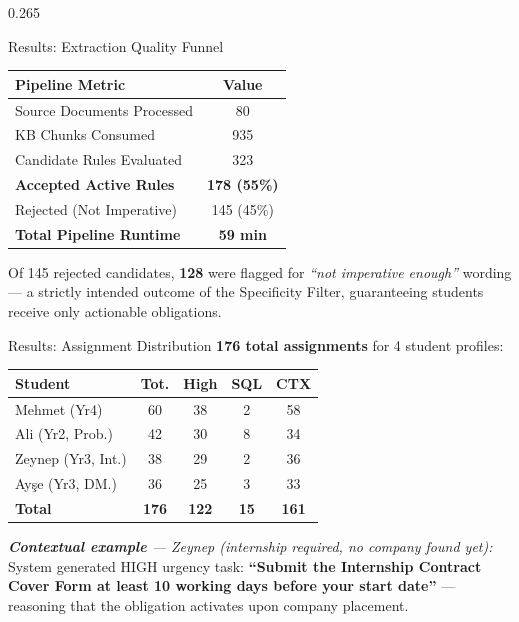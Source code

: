 \documentclass[final]{beamer}
\begin{document}
\begin{frame}[t]
\begin{columns}[T]
\begin{column}{0.265\paperwidth}
\begin{block}{Results: Extraction Quality Funnel}
\begin{center}
\begin{tabular}{lc}
  \toprule
  \textbf{Pipeline Metric}        & \textbf{Value} \\
  \midrule
  Source Documents Processed      & 80 \\
  KB Chunks Consumed              & 935 \\
  Candidate Rules Evaluated       & 323 \\
  \textbf{Accepted Active Rules}  & \textbf{178 (55\%)} \\
  Rejected (Not Imperative)       & 145 (45\%) \\
  \midrule
  \textbf{Total Pipeline Runtime} & \textbf{59 min} \\
  \bottomrule
\end{tabular}
\end{center}

\vskip0.25cm
Of 145 rejected candidates, \textbf{128} were flagged
for \textit{``not imperative enough''} wording --- a
strictly intended outcome of the Specificity Filter,
guaranteeing students receive only actionable obligations.
\end{block}

\begin{block}{Results: Assignment Distribution}
\textbf{176 total assignments} for 4 student profiles:

\vskip0.25cm
\begin{center}
{\small
\setlength{\tabcolsep}{4pt}
\begin{tabular}{lcccc}
  \toprule
  \textbf{Student}     & \textbf{Tot.} & \textbf{High} &
  \textbf{SQL} & \textbf{CTX} \\
  \midrule
  Mehmet (Yr4)         & 60 & 38 &  2 & 58 \\
  Ali (Yr2, Prob.)     & 42 & 30 &  8 & 34 \\
  Zeynep (Yr3, Int.)   & 38 & 29 &  2 & 36 \\
  Ay\c{s}e (Yr3, DM.) & 36 & 25 &  3 & 33 \\
  \midrule
  \textbf{Total}       & \textbf{176} & \textbf{122} &
  \textbf{15} & \textbf{161} \\
  \bottomrule
\end{tabular}}
\end{center}

\vskip0.30cm
\textit{\small \textbf{Contextual example} --- Zeynep
(internship required, no company found yet):} System
generated HIGH urgency task:
\textbf{``Submit the Internship Contract Cover Form at
least 10 working days before your start date''} ---
reasoning that the obligation activates upon company
placement.


\end{block}
\end{column}
\end{columns}
\end{frame}
\end{document}
